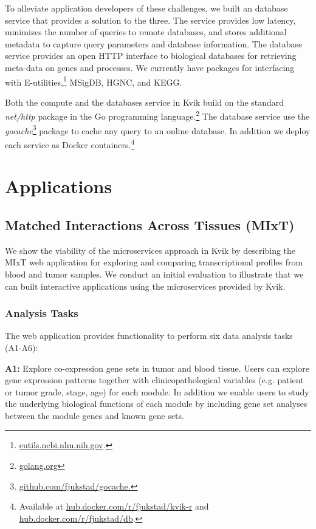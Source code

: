 To alleviate application developers of these challenges, we built an database
service that provides a solution to the three. The service provides low latency,
minimizes the number of queries to remote databases, and stores additional
metadata to capture query parameters and database information. 
The database service provides an open HTTP interface to biological databases for
retrieving meta-data on genes and processes. 
We currently have packages for
interfacing with E-utilities,\footnote{\url{eutils.ncbi.nlm.nih.gov}.}
MSigDB, HGNC, and KEGG.

Both the compute and the databases service in Kvik build on the standard
\emph{net/http} package in the Go programming
language.\footnote{\url{golang.org}} The database service use
the \emph{gocache}\footnote{\url{github.com/fjukstad/gocache.}} package to cache
any query to an online database. In addition we deploy each service as Docker
containers.\footnote{Available at \url{hub.docker.com/r/fjukstad/kvik-r} and
\url{hub.docker.com/r/fjukstad/db}.}

\section{Applications} 

\subsection{Matched Interactions Across Tissues (MIxT)}
We show the viability of the microservices approach in Kvik by describing the
MIxT web application for exploring and comparing transcriptional profiles from
blood and tumor samples.  We conduct an initial evaluation to illustrate that we
can built interactive applications using the microservices provided by Kvik. 

\subsubsection{Analysis Tasks}
The web application provides functionality to perform six data analysis tasks
(A1-A6):

\textbf{A1:} Explore co-expression gene sets in tumor and blood tissue.  Users
can explore gene expression patterns together with clinicopathological variables
(e.g. patient or tumor grade, stage, age) for each module.  In addition we
enable users to study the underlying biological functions of each module by
including gene set analyses between the module genes and known gene sets. 


